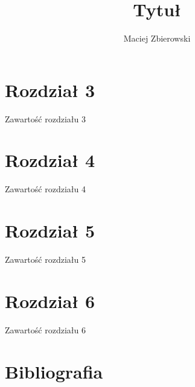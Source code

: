 \documentclass[11pt, a4paper]{article}
\author{Maciej Zbierowski}
\title{Tytuł}
\begin{document}
	\maketitle
	\tableofcontents
	\newpage
	
		
	
	\newpage
	
	
	
	\newpage
	
	\section{Rozdział 3}
	Zawartość rozdziału 3
	
	\newpage
	
	\section{Rozdział 4}
	Zawartość rozdziału 4
	
	\newpage

	\section{Rozdział 5}
	Zawartość rozdziału 5
	
	\newpage
	
	\section{Rozdział 6}
	Zawartość rozdziału 6
	
	\newpage
	
	\section{Bibliografia}
	\begin{thebibliography}{2}
	
	\end{thebibliography}
\end{document}

